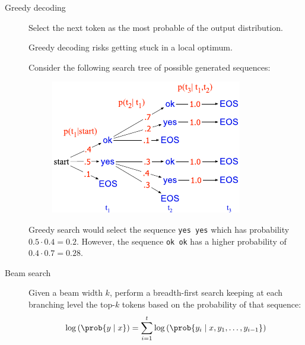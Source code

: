 \begin{description}
    \item[Greedy decoding] 
        Select the next token as the most probable of the output distribution.

        \begin{remark}
            Greedy decoding risks getting stuck in a local optimum.

            \indenttbox
            \begin{example}
                Consider the following search tree of possible generated sequences:

                \begin{minipage}{0.35\linewidth}
                    \begin{figure}[H]
                        \centering
                        \includegraphics[width=\linewidth]{./img/_greedy_decoding_local_minimum.pdf}
                    \end{figure}
                \end{minipage}
                \hfill
                \begin{minipage}[b]{0.6\linewidth}
                    Greedy search would select the sequence \texttt{yes yes} which has probability $0.5 \cdot 0.4 = 0.2$. However, the sequence \texttt{ok ok} has a higher probability of $0.4 \cdot 0.7 = 0.28$.
                \end{minipage}
            \end{example}
        \end{remark}

    \item[Beam search] 
        Given a beam width $k$, perform a breadth-first search keeping at each branching level the top-$k$ tokens based on the probability of that sequence:
        \[ \log\left( \prob{y \mid x} \right) = \sum_{i=1}^{t} \log\left( \prob{ y_i \mid x, y_1, \dots, y_{i-1} } \right) \]


\end{description}
